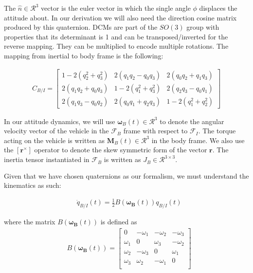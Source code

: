 \documentclass[conf]{new-aiaa}
\begin{document}
\begin{singlespace}
The $\hat{n} \in \mathcal{R}^3$ vector is the euler vector in which the single angle $\phi$ displaces the attitude about. In our derivation we will also need the direction cosine matrix produced by this quaternion. DCMs are part of the $SO(3)$ group with properties that its determinant is 1 and can be transposed/inverted for the reverse mapping. They can be multiplied to encode multiple rotations. The mapping from inertial to body frame is the following:

\begin{align}
C_{B/I}={\begin{bmatrix}1-2(q_{2}^{2}+q_{3}^{2})&2(q_{1}q_{2}-q_{0}q_{3})&2(q_{0}q_{2}+q_{1}q_{3})\\2(q_{1}q_{2}+q_{0}q_{3})&1-2(q_{1}^{2}+q_{3}^{2})&2(q_{2}q_{3}-q_{0}q_{1})\\2(q_{1}q_{3}-q_{0}q_{2})&2(q_{0}q_{1}+q_{2}q_{3})&1-2(q_{1}^{2}+q_{2}^{2})\end{bmatrix}}
\end{align}

In our attitude dynamics, we will use $\bm{\omega}_B(t) \in \mathcal{R}^3$ to denote the angular velocity vector of the vehicle in the $\mathcal{F}_B$ frame with respect to $\mathcal{F}_I$. The torque acting on the vehicle is written as $\mathbf{M}_B(t) \in \mathcal{R}^3$ in the body frame. We also use the $\left[\mathbf{r}^\times \right]$ operator to denote the skew symmetric form of the vector $\mathbf{r}$. The inertia tensor instantiated in $\mathcal{F}_B$ is written as $J_B \in \mathcal{R}^{3\times 3}$.

Given that we have chosen quaternions as our formalism, we must understand the kinematics as such:

\begin{align}
 & \dot{q}_{B/I}(t) = \frac{1}{2} B(\bm{\omega_B}(t)) q_{B/I}(t)
\end{align}

where the matrix $B(\bm{\omega_B}(t))$ is defined as 
\begin{align}
& B(\bm{\omega_B}(t)) = 
	\begin{bmatrix}
	0 & -\omega_1 & -\omega_2 & -\omega_3\\ 
	\omega_1 & 0 & \omega_3 & -\omega_2 \\
	\omega_2 & -\omega_3 & 0 & \omega_1 \\
	\omega_3 & \omega_2 & -\omega_1  & 0  \\
	\end{bmatrix}
\end{align}


\end{singlespace}
\end{document}
